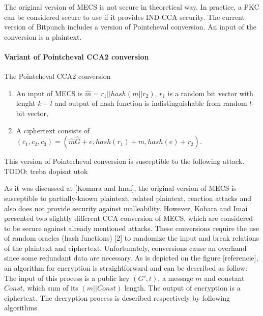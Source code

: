The original version of MECS is not secure in theoretical way. In practice, a PKC can be considered secure to use if it provides IND-CCA security. The current version of Bitpunch includes a version of Pointcheval conversion. An input of the conversion is a plaintext. 
 
\paragraph{Variant of Pointcheval CCA2 conversion} %
\label{par:cca2_pointcheval_konverzia}
\begin{algorithm}[H]
	\caption{The Pointcheval CCA2 conversion}
	\label{mecs_kgen}
	\begin{enumerate}
	\item An input of MECS is $\widehat{m} = r_1 || hash(m || r_2)$, $r_1$ is a random bit vector with lenght $k - l$ and output of hash function is indistinguishable from random $l$-bit vector,
	\item A ciphertext consists of $(c_1, c_2, c_3) = (\widehat{m}\widehat{G} + e, hash(r_1) + m, hash(e) + r_2)$.
	\end{enumerate}
\end{algorithm}

This version of Pointecheval conversion is susceptible to the following attack.
TODO: treba dopisat utok


\noindent As it was discussed at [Komara and Imai], the original version of MECS is susceptible to partially-known plaintext,
related plaintext, reaction attacks and also does not provide security against malleability. However, Kobara and Imai presented two slightly different CCA conversion of MECS, which are considered to be secure against already mentioned attacks. These conversions require the use of random oracles (hash functions) [2] to randomize the input and break relations of
the plaintext and ciphertext. Unfortunately, conversions cause an overhand since some redundant data are necessary.
As is depicted on the figure [referencie], an algorithm for encryption is straightforward and can be described as follow: The input of this process is a public key $(G',t)$, a message $m$ and constant $Const$, which sum of its $(m||Const)$ length. The output of encryption is a ciphertext. The decryption process is described respectively by following algorithms.

